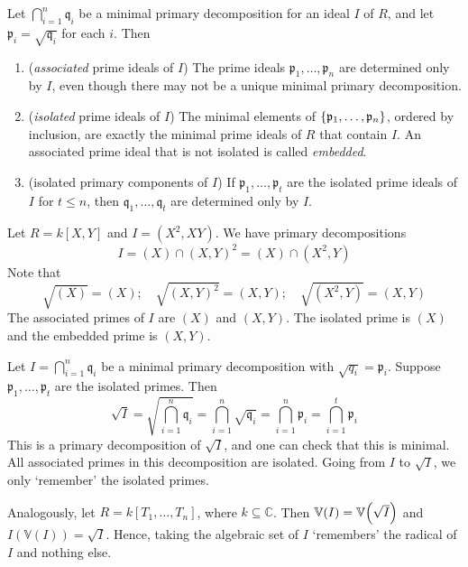 \begin{theorem}
    Let \( \bigcap_{i=1}^n \mathfrak q_i \) be a minimal primary decomposition for an ideal \( I \) of \( R \), and let \( \mathfrak p_i = \sqrt{\mathfrak q_i} \) for each \( i \).
    Then
    \begin{enumerate}
        \item (\emph{associated} prime ideals of \( I \)) The prime ideals \( \mathfrak p_1, \dots, \mathfrak p_n \) are determined only by \( I \), even though there may not be a unique minimal primary decomposition.
        \item (\emph{isolated} prime ideals of \( I \)) The minimal elements of \( \qty{\mathfrak p_1, \dots, \mathfrak p_n} \), ordered by inclusion, are exactly the minimal prime ideals of \( R \) that contain \( I \).
        An associated prime ideal that is not isolated is called \emph{embedded}.
        \item (isolated primary components of \( I \)) If \( \mathfrak p_1, \dots, \mathfrak p_t \) are the isolated prime ideals of \( I \) for \( t \leq n \), then \( \mathfrak q_1, \dots, \mathfrak q_t \) are determined only by \( I \).
    \end{enumerate}
\end{theorem}
\begin{example}
    Let \( R = k[X, Y] \) and \( I = (X^2, XY) \).
    We have primary decompositions
    \[ I = (X) \cap (X, Y)^2 = (X) \cap (X^2, Y) \]
    Note that
    \[ \sqrt{(X)} = (X);\quad \sqrt{(X, Y)^2} = (X, Y);\quad \sqrt{(X^2, Y)} = (X, Y) \]
    The associated primes of \( I \) are \( (X) \) and \( (X, Y) \).
    The isolated prime is \( (X) \) and the embedded prime is \( (X, Y) \).
\end{example}
\begin{remark}
    Let \( I = \bigcap_{i=1}^n \mathfrak q_i \) be a minimal primary decomposition with \( \sqrt{q_i} = \mathfrak p_i \).
    Suppose \( \mathfrak p_1, \dots, \mathfrak p_t \) are the isolated primes.
    Then
    \[ \sqrt{I} = \sqrt{\bigcap_{i=1}^n \mathfrak q_i} = \bigcap_{i=1}^n \sqrt{\mathfrak q_i} = \bigcap_{i=1}^n \mathfrak p_i = \bigcap_{i=1}^t \mathfrak p_i \]
    This is a primary decomposition of \( \sqrt{I} \), and one can check that this is minimal.
    All associated primes in this decomposition are isolated.
    Going from \( I \) to \( \sqrt{I} \), we only `remember' the isolated primes.

    Analogously, let \( R = k[T_1, \dots, T_n] \), where \( k \subseteq \mathbb C \).
    Then \( \mathbb V(I) = \mathbb V\qty(\sqrt{I}) \) and \( I(\mathbb V(I)) = \sqrt{I} \).
    Hence, taking the algebraic set of \( I \) `remembers' the radical of \( I \) and nothing else.
\end{remark}
